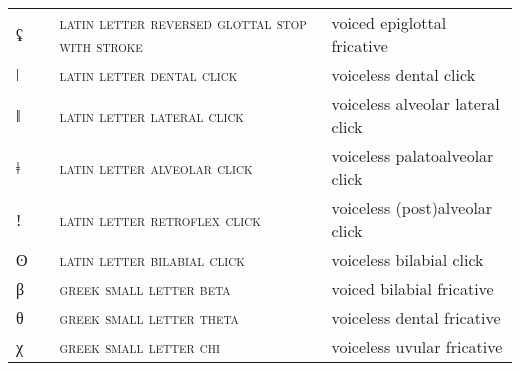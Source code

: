 \begin{center}
\begin{xtabular}{ l l L{4.5cm} L{4.5cm} }
ʢ &  & \textsc{latin letter reversed glottal stop with stroke} & voiced epiglottal fricative \\ 
ǀ &  & \textsc{latin letter dental click} & voiceless dental click \\ 
ǁ &  & \textsc{latin letter lateral click} & voiceless alveolar lateral click \\ 
ǂ &  & \textsc{latin letter alveolar click} & voiceless palatoalveolar click \\ 
ǃ &  & \textsc{latin letter retroflex click} & voiceless (post)alveolar click \\ 
ʘ &  & \textsc{latin letter bilabial click} & voiceless bilabial click \\ 
β &  & \textsc{greek small letter beta} & voiced bilabial fricative \\ 
θ &  & \textsc{greek small letter theta} & voiceless dental fricative \\ 
χ &  & \textsc{greek small letter chi} & voiceless uvular fricative \\
\end{xtabular}
\end{center}
